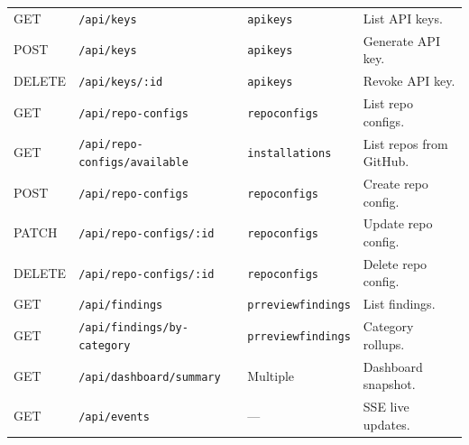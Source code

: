 \begin{longtable}{@{}lllp{}@{}}
  GET  & \texttt{/api/keys}                        & \texttt{apikeys} & List API keys. \\
  POST & \texttt{/api/keys}                        & \texttt{apikeys} & Generate API key. \\
  DELETE & \texttt{/api/keys/:id}                  & \texttt{apikeys} & Revoke API key. \\
  GET  & \texttt{/api/repo-configs}                & \texttt{repoconfigs} & List repo configs. \\
  GET  & \texttt{/api/repo-configs/available}      & \texttt{installations} & List repos from GitHub. \\
  POST & \texttt{/api/repo-configs}                & \texttt{repoconfigs} & Create repo config. \\
  PATCH & \texttt{/api/repo-configs/:id}           & \texttt{repoconfigs} & Update repo config. \\
  DELETE & \texttt{/api/repo-configs/:id}          & \texttt{repoconfigs} & Delete repo config. \\
  GET  & \texttt{/api/findings}                    & \texttt{prreviewfindings} & List findings. \\
  GET  & \texttt{/api/findings/by-category}        & \texttt{prreviewfindings} & Category rollups. \\
  GET  & \texttt{/api/dashboard/summary}           & Multiple & Dashboard snapshot. \\
  GET  & \texttt{/api/events}                      & --- & SSE live updates. \\
\end{longtable}
